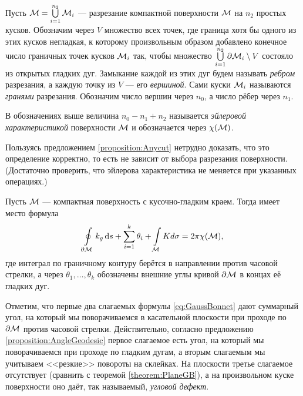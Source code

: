Пусть $\mathcal{M} = \bigcup\limits_{i = 1}^{n_2}\mathcal{M}_i$ --- разрезание компактной поверхности $\mathcal{M}$ на $n_2$ простых кусков. Обозначим через $V$ множество всех точек, где граница хотя бы одного из этих кусков негладкая, к которому произвольным образом добавлено конечное число граничных точек кусков $\mathcal{M}_i$ так, чтобы множество $\bigcup\limits_{i = 1}^{n_2}\partial\mathcal{M}_i \setminus V$ состояло из открытых гладких дуг. Замыкание каждой из этих дуг будем называть \textit{ребром} разрезания, а каждую точку из $V$ --- его \textit{вершиной}. Сами куски $\mathcal{M}_i$ называются \textit{гранями} разрезания. Обозначим число вершин через $n_0$, а число рёбер через $n_1$.

\begin{definition}
	В обозначениях выше величина $n_0 - n_1 + n_2$ называется \textit{эйлеровой характеристикой} поверхности $\mathcal{M}$ и обозначается через $\chi(\mathcal{M})$.
\end{definition}

Пользуясь предложением \ref{proposition:Anycut} нетрудно доказать, что это определение корректно, то есть не зависит от выбора разрезания поверхности. (Достаточно проверить, что эйлерова характеристика не меняется при указанных операциях.)

\begin{theorem} %
	Пусть $\mathcal{M}$ --- компактная поверхность с кусочно-гладким краем. Тогда имеет место формула
	\begin{equation} \label{eq:GaussBonnet}
		\oint\limits_{\partial \mathcal{M}}k_g\mathop{}\!\mathrm{d} s + \sum_{i = 1}^k\theta_i + \int\limits_{\mathcal{M}}K\\d\sigma = 2\pi\chi(\mathcal{M}),
	\end{equation}
	где интеграл по граничному контуру берётся в направлении против часовой стрелки, а через $\theta_1, \ldots, \theta_k$ обозначены внешние углы кривой $\partial \mathcal{M}$ в концах её гладких дуг.
\end{theorem}

Отметим, что первые два слагаемых формулы \eqref{eq:GaussBonnet} дают суммарный угол, на который мы поворачиваемся в касательной плоскости при проходе по $\partial \mathcal{M}$ против часовой стрелки. Действительно, согласно предложению \ref{proposition:AngleGeodesic} первое слагаемое есть угол, на который мы поворачиваемся при проходе по гладким дугам, а вторым слагаемым мы учитываем <<резкие>> повороты на склейках. На плоскости третье слагаемое отсутствует (сравнить с теоремой \ref{theorem:PlaneGB}), а на произвольном куске поверхности оно даёт, так называемый, \textit{угловой дефект}.

